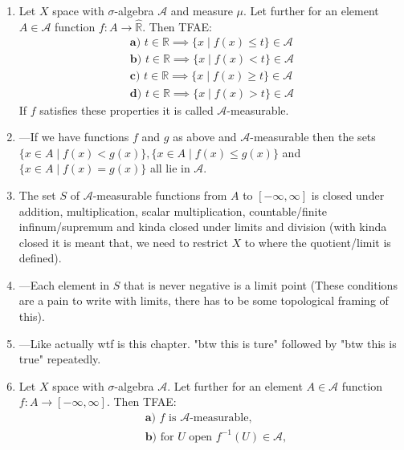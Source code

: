\documentclass{article}
\begin{document}
\begin{enumerate}
    \section{Del II}
    From now on we mean by $\hat{\mathbb{R}}$ the set $[-\infty,\infty]$ and by $\hat{\mathbb{R}}_+$ the set $[0,\infty]$
    \item Let $X$ space with $\sigma$-algebra $\mathscr{A}$ and measure $\mu$. Let further for an element $A\in \mathscr{A}$ function $f: A \to \hat{\mathbb{R}{}}$. Then TFAE:\begin{align*}
        \textbf{a) } t\in \mathbb{R} \implies \{x\mid f(x)\leq t\}\in \mathscr{A}\\
        \textbf{b) } t\in \mathbb{R} \implies \{x\mid f(x)< t\}\in \mathscr{A}\\
        \textbf{c) } t\in \mathbb{R} \implies \{x\mid f(x)\geq t\}\in \mathscr{A}\\
        \textbf{d) } t\in \mathbb{R} \implies \{x\mid f(x)> t\}\in \mathscr{A}
    \end{align*}
    If $f$ satisfies these properties it is called $\mathscr{A}$-measurable.
    \item ---If we have functions $f$ and $g$ as above and $\mathscr{A}$-measurable then the sets $\{x\in A \mid f(x)<g(x)\}, \{x\in A \mid f(x)\leq g(x)\}$ and $\{x\in A \mid f(x)=g(x)\}$ all lie in $\mathscr{A}$.
    \item The set $S$ of $\mathcal{A}$-measurable functions from $A$ to $[-\infty,\infty]$  is closed under addition, multiplication, scalar multiplication, countable/finite infinum/supremum and kinda closed under limits and division (with kinda closed it is meant that, we need to restrict $X$ to where the quotient/limit is defined).
    \item ---Each element in $S$ that is never negative is a limit point (These conditions are a pain to write with limits, there has to be some topological framing of this).
    \item ---Like actually wtf is this chapter. "btw this is ture" followed by "btw this is true" repeatedly.
    \item Let $X$ space with $\sigma$-algebra $\mathcal{A}$. Let further for an element $A\in \mathcal{A}$ function $f: A \to [-\infty,\infty]$. Then TFAE:\begin{align*}
        &\textbf{a) } f \text{ is $\mathcal{A}$-measurable},\\
        &\textbf{b) } \text{for $U$ open }f^{-1}(U)\in\mathcal{A},\\

\end{align*}
\end{enumerate}
\end{document}
